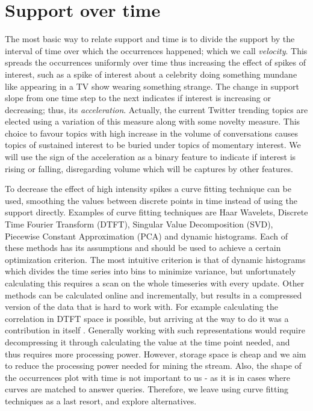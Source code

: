 \documentclass[11pt]{llncs} %
\begin{document}

\section{Support over time}

The most basic way to relate support and time is to divide the support by the interval of time over which the occurrences happened; which we call \emph{velocity}. This spreads the occurrences uniformly over time thus increasing the effect of spikes of interest, such as a spike of interest about a celebrity doing something mundane like appearing in a TV show wearing something strange. The change in support slope from one time step to the next indicates if interest is increasing or decreasing; thus, its \emph{acceleration}. Actually, the current Twitter trending topics are elected using a variation of this measure along with some novelty measure. This choice to favour topics with high increase in the volume of conversations causes topics of sustained interest to be buried under topics of momentary interest. We will use the sign of the acceleration as a binary feature to indicate if interest is rising or falling, disregarding volume which will be captures by other features. 

To decrease the effect of high intensity spikes a curve fitting technique can be used, smoothing the values between discrete points in time instead of using the support directly. Examples of curve fitting techniques are Haar Wavelets, Discrete Time Fourier Transform (DTFT), Singular Value Decomposition (SVD), Piecewise Constant Approximation (PCA) and dynamic histograms. Each of these methods has its assumptions and should be used to achieve a certain optimization criterion. The most intuitive criterion is that of dynamic histograms which divides the time series into bins to minimize variance, but unfortunately calculating this requires a scan on the whole timeseries with every update. Other methods can be calculated online and incrementally, but results in a compressed version of the data that is hard to work with. For example calculating the correlation in DTFT space is possible, but arriving at the way to do it was a contribution in itself \cite{shasha-2001}. Generally working with such representations would require decompressing it through calculating the value at the time point needed, and thus requires more processing power. However, storage space is cheap and we aim to reduce the processing power needed for mining the stream. Also, the shape of the occurrences plot with time is not important to us - as it is in cases where curves are matched to answer queries. Therefore, we leave using curve fitting techniques as a last resort, and explore alternatives.
 
\end{document}
